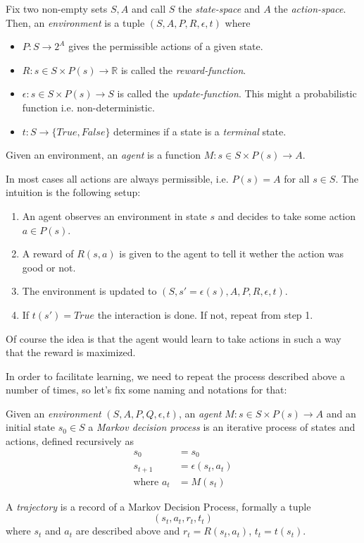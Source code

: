 \documentclass{article}
\theoremstyle{changedot}
\theoremstyle{changedotbreak}
\theoremstyle{nonumberplain}
\begin{document}
\begin{definition}
  Fix two non-empty sets $S, A$ and call $S$ the \emph{state-space} and $A$ the \emph{action-space}. Then, an \emph{environment} is a tuple $(S, A, P, R, \epsilon, t)$ where

  \begin{itemize}
    \item $P : S \to 2^{A}$ gives the permissible actions of a given state.
    \item $R : s\in S \times P(s) \to \mathbb R$ is called the \emph{reward-function}.
    \item $\epsilon : s\in S \times P(s) \to S$ is called the \emph{update-function}. This might a probabilistic function i.e. non-deterministic.
    \item $t : S \to \{True, False\}$ determines if a state is a \emph{terminal} state.
  \end{itemize}

  Given an environment, an \emph{agent} is a function $M : s\in S \times P(s) \to A$.
\end{definition}

In most cases all actions are always permissible, i.e. $P(s) = A$ for all $s \in S$. The intuition is the following setup:

\begin{enumerate}
  \item An agent observes an environment in state $s$ and decides to take some action $a \in P(s)$.
  \item A reward of $R(s, a)$ is given to the agent to tell it wether the action was good or not.
  \item The environment is updated to $(S, s'=\epsilon(s), A, P, R, \epsilon, t)$.
    \item If $t(s') = True$ the interaction is done. If not, repeat from step 1.
\end{enumerate}

Of course the idea is that the agent would learn to take actions in such a way that the reward is maximized.

In order to facilitate learning, we need to repeat the process described above a number of times, so let's fix some naming and notations for that:

\begin{definition}
  Given an \emph{environment} $(S, A, P, Q, \epsilon, t)$, an \emph{agent} $M : s \in S \times P(s) \to A$ and an initial state $s_{0} \in S$ a \emph{Markov decision process} is an iterative process of states and actions, defined recursively as
  \begin{align}
    s_{0} &= s_{0} \\
    s_{t+1} &= \epsilon(s_{t}, a_{t}) \\
    \text{where } a_{t} &= M(s_{t})
  \end{align}

  A \emph{trajectory} is a record of a Markov Decision Process, formally a tuple \[(s_{t}, a_{t}, r_{t}, t_{t})\] where $s_{t}$ and $a_{t}$ are described above and $r_{t} = R(s_{t}, a_{t})$, $t_{t} = t(s_{t})$.
\end{definition}
\end{document}
